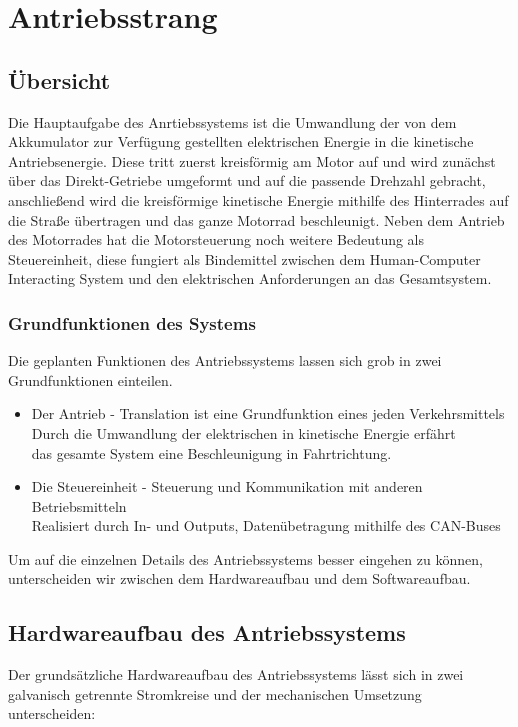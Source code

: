 \chapter{Antriebsstrang}


\section{Übersicht}
Die Hauptaufgabe des Anrtiebssystems ist die Umwandlung der von dem Akkumulator zur Verfügung gestellten elektrischen Energie in die kinetische Antriebsenergie. Diese tritt zuerst kreisförmig am Motor auf und wird zunächst über das Direkt-Getriebe umgeformt und auf die passende Drehzahl gebracht, anschließend wird die kreisförmige kinetische Energie mithilfe des Hinterrades auf die Straße übertragen und das ganze Motorrad beschleunigt. Neben dem Antrieb des Motorrades hat die Motorsteuerung noch weitere Bedeutung als Steuereinheit, diese fungiert als Bindemittel zwischen dem Human-Computer Interacting System und den elektrischen Anforderungen an das Gesamtsystem.

\subsection{Grundfunktionen des Systems}
Die geplanten Funktionen des Antriebssystems lassen sich grob in zwei Grundfunktionen einteilen.

\begin{itemize}
	\item Der Antrieb - Translation ist eine Grundfunktion eines jeden Verkehrsmittels
	\\ Durch die Umwandlung der elektrischen in kinetische Energie erfährt 
	\\ das gesamte System eine Beschleunigung in Fahrtrichtung.
	\item Die Steuereinheit - Steuerung und Kommunikation mit anderen Betriebsmitteln
	\\ Realisiert durch In- und Outputs, Datenübetragung mithilfe des CAN-Buses 
\end{itemize}

Um auf die einzelnen Details des Antriebssystems besser eingehen zu können, unterscheiden wir zwischen dem Hardwareaufbau und dem Softwareaufbau.

\newpage


\section{Hardwareaufbau des Antriebssystems}
Der grundsätzliche Hardwareaufbau des Antriebssystems lässt sich in zwei galvanisch getrennte Stromkreise und der mechanischen Umsetzung unterscheiden:

